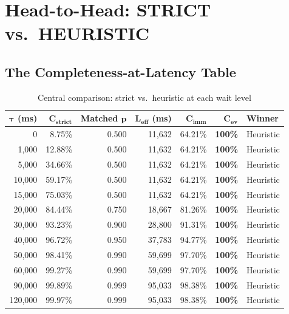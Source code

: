 \documentclass[11pt,a4paper]{article}
\begin{document}
\section{Head-to-Head: STRICT vs.\ HEURISTIC}

\subsection{The Completeness-at-Latency Table}

\begin{table}[H]
\centering
\caption{Central comparison: strict vs.\ heuristic at each wait level}
\label{tab:head-to-head}
\footnotesize
\begin{tabular}{rrrrrrl}
\toprule
$\bm{\tau}$ \textbf{(ms)} & $\mathbf{C_{\textbf{strict}}}$ & \textbf{Matched} $\bm{p}$ & $\mathbf{L_{\textbf{eff}}}$ \textbf{(ms)} & $\mathbf{C_{\textbf{imm}}}$ & $\mathbf{C_{\textbf{ev}}}$ & \textbf{Winner} \\
\midrule
0      & 8.75\%  & 0.500 & 11,632 & 64.21\% & \textbf{100\%} & Heuristic \\
1,000  & 12.88\% & 0.500 & 11,632 & 64.21\% & \textbf{100\%} & Heuristic \\
5,000  & 34.66\% & 0.500 & 11,632 & 64.21\% & \textbf{100\%} & Heuristic \\
10,000 & 59.17\% & 0.500 & 11,632 & 64.21\% & \textbf{100\%} & Heuristic \\
15,000 & 75.03\% & 0.500 & 11,632 & 64.21\% & \textbf{100\%} & Heuristic \\
20,000 & 84.44\% & 0.750 & 18,667 & 81.26\% & \textbf{100\%} & Heuristic \\
30,000 & 93.23\% & 0.900 & 28,800 & 91.31\% & \textbf{100\%} & Heuristic \\
40,000 & 96.72\% & 0.950 & 37,783 & 94.77\% & \textbf{100\%} & Heuristic \\
50,000 & 98.41\% & 0.990 & 59,699 & 97.70\% & \textbf{100\%} & Heuristic \\
60,000 & 99.27\% & 0.990 & 59,699 & 97.70\% & \textbf{100\%} & Heuristic \\
90,000 & 99.89\% & 0.999 & 95,033 & 98.38\% & \textbf{100\%} & Heuristic \\
120,000& 99.97\% & 0.999 & 95,033 & 98.38\% & \textbf{100\%} & Heuristic \\
\bottomrule
\end{tabular}
\end{table}
\end{document}
